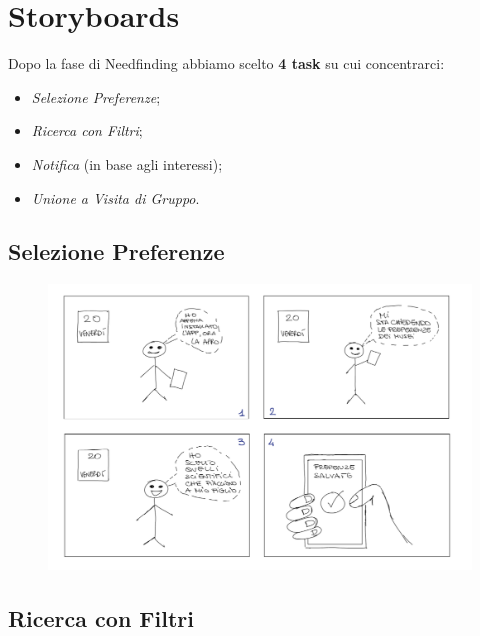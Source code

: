 \section{Storyboards}

Dopo la fase di Needfinding abbiamo scelto \textbf{4 task} su cui concentrarci:
\begin{itemize}
    \item \textit{Selezione  Preferenze};
    \item \textit{Ricerca con Filtri};
    \item \textit{Notifica} (in base agli interessi);
    \item \textit{Unione a Visita di Gruppo}.
\end{itemize}

\subsection{Selezione Preferenze}

\begin{figure}[h]
    \centering
    \includegraphics[width=1.0\textwidth]{images/storyboards/Storyboard-1-scelta-preferenze-notitle.png}
\end{figure}

\newpage

\subsection{Ricerca con Filtri}


